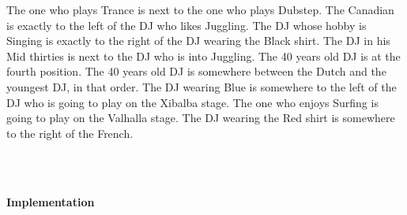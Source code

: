 ﻿\documentclass[a4paper,12pt]{report}
\begin{document}
The one who plays Trance is next to the one who plays Dubstep.\newline
The Canadian is exactly to the left of the DJ who likes Juggling.\newline
The DJ whose hobby is Singing is exactly to the right of the DJ wearing the Black shirt.\newline
The DJ in his Mid thirties is next to the DJ who is into Juggling.\newline
The 40 years old DJ is at the fourth position.\newline
The 40 years old DJ is somewhere between the Dutch and the youngest DJ, in that order.\newline
The DJ wearing Blue is somewhere to the left of the DJ who is going to play on the \newline Xibalba stage.\newline
The one who enjoys Surfing is going to play on the Valhalla stage.\newline
The DJ wearing the Red shirt is somewhere to the right of the French.\newline


\\
\\
\begin{Large}
 \textbf{Implementation}\\
\end{Large}
\end{document}
